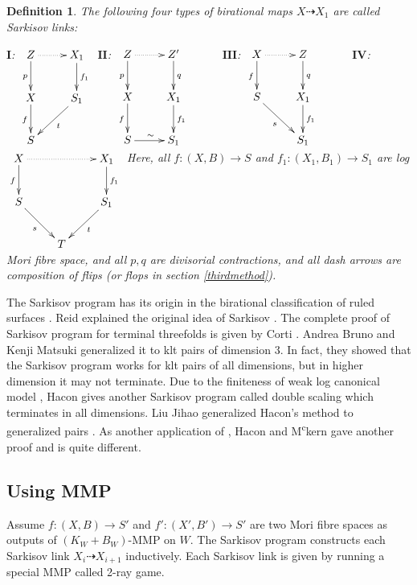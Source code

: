 \documentclass[11pt]{amsart}
\numberwithin{equation}{section}
\newtheorem{defn}{Definition}[subsection]
\begin{document}
\begin{defn}
  The following four types of  birational maps $X\dashrightarrow X_1$ are called Sarkisov links: 

  $\textbf{I}$:
  $\xymatrix{
    Z\ar[d]_p\ar@{.>}[r]&X_1\ar[d]^{f_1}\\
    X\ar[d]_f&S_1\ar[dl]^{t}\\
  S &}$
  $\textbf{II}$:
  $\xymatrix{
    Z\ar[d]_p\ar@{.>}[r]&Z'\ar[d]^{q}&\\
    X\ar[d]_{f}&X_1\ar[d]^{f_1}\\
    S\ar[r]^{\sim}&S_1}$
  $\textbf{III}$:
  $
  \xymatrix{
    X\ar@{.>}[r]\ar[d]_f& Z\ar[d]^q& \\
    S\ar[rd]_{s}         & X_{1}\ar[d]^{f_{1}}&\\
    &S_{1}
  }
  $
  $\textbf{IV}$:
  $\xymatrix{
    X\ar[d]_f\ar@{.>}[rr]&&X_1\ar[d]^{f_1}\\
    S\ar[dr]_{s}&&S_1\ar[dl]^{t}\\
    &T &}$
    Here, all $ f:(X,B)\to S $ and $ f_1:(X_1,B_1)\to S_1 $ are log Mori fibre space, and all $ p,q $ are divisorial contractions, and all dash arrows are composition of flips (or flops in section \ref{thirdmethod}). 
\end{defn}
The Sarkisov program has its origin in the birational classification of ruled surfaces \cite{sarkisovCONICBUNDLESTRUCTURES1983}. 
Reid explained the original idea of Sarkisov \cite{sarkisovBirationalmapsofstandardQfanoFibering}. 
The complete proof of Sarkisov program for terminal threefolds is given  by Corti \cite{cortiFactoringBirationalMaps}. 
Andrea Bruno and Kenji Matsuki \cite{brunoLogSarkisovProgram1995} generalized it to klt pairs of dimension $3$. In fact, they showed that the Sarkisov program works for klt pairs of all dimensions, but in higher dimension it may not terminate.  
Due to the finiteness of weak log canonical model \cite{birkarExistenceMinimalModels2009}, Hacon gives another Sarkisov program called double scaling \cite{haconMinimalModelProgram2012} which terminates in all dimensions. 
Liu Jihao generalized Hacon's method to generalized pairs \cite{liuSarkisovProgramGeneralized2021}. 
As another application of \cite{birkarExistenceMinimalModels2009}, Hacon and M\textsuperscript{c}kern gave another proof \cite{haconSarkisovProgram2012} and is quite different.
\subsection{Using MMP}
Assume $f:(X,B)\to S'$ and $f':(X',B')\to S'$ are two Mori fibre spaces as outputs of $(K_{W}+B_{W})$-MMP on $W$. The Sarkisov program constructs each Sarkisov link $X_{i}\dashrightarrow X_{i+1}$ inductively. Each Sarkisov link is given by running a special MMP called 2-ray game.
\end{document}

